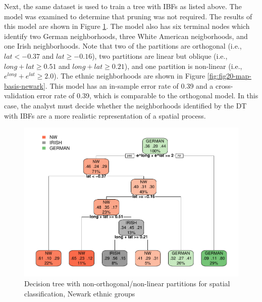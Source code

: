 \documentclass[]{elsarticle} %
\makeatletter
\def\maxwidth{\ifdim\Gin@nat@width>\linewidth\linewidth
\else\Gin@nat@width\fi}
\let\Oldincludegraphics\includegraphics
\renewcommand{\includegraphics}[1]{\Oldincludegraphics[width=\maxwidth]{#1}}
\makeatother
\begin{document}
Next, the same dataset is used to train a tree with IBFs as listed
above. The model was examined to determine that pruning was not
required. The results of this model are shown in Figure
\ref{fig:fig19-tree-basis-newark}. The model also has six terminal nodes
which identify two German neighborhoods, three White American
neigborhoods, and one Irish neighborhoods. Note that two of the
partitions are orthogonal (i.e., \(lat < -0.37\) and \(lat \ge -0.16\)),
two partitions are linear but oblique (i.e., \(long+lat \ge 0.51\) and
\(long+lat \ge 0.21\)), and one partition is non-linear (i.e.,
\(e^{long}+e^{lat} \ge 2.0\)). The ethnic neighborhoods are shown in
Figure \ref{fig:fig20-map-basis-newark}. This model has an in-sample
error rate of 0.39 and a cross-validation error rate of 0.39, which is
comparable to the orthogonal model. In this case, the analyst must
decide whether the neighborhoods identified by the DT with IBFs are a
more realistic representation of a spatial process.

\begin{figure}[htbp]
\centering
\includegraphics{Trees_with_Base_Functions_v2_files/figure-latex/fig19-tree-basis-newark-1.pdf}
\caption{\label{fig:fig19-tree-basis-newark}Decision tree with
non-orthogonal/non-linear partitions for spatial classification, Newark
ethnic groups}
\end{figure}
\end{document}
